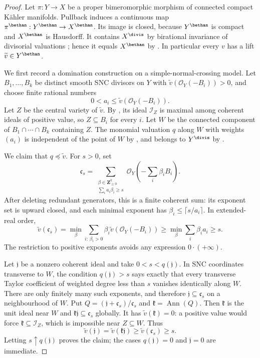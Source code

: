 \begin{proof}
Let \(\pi:Y\to X\) be a proper bimeromorphic morphism of connected
compact K\"ahler manifolds.  Pullback induces a continuous map
\(\pi^{\bethan}:Y^{\bethan}\to X^{\bethan}\).  Its image is closed,
because \(Y^{\bethan}\) is compact and \(X^{\bethan}\) is Hausdorff.  It
contains \(X^{\divis}\) by birational invariance of divisorial valuations
\cite[Remark~2.3.2]{MP24}; hence it equals \(X^{\bethan}\) by
.  In particular every \(v\) has a lift
\(\widetilde v\in Y^{\bethan}\).

We first record a domination construction on a simple-normal-crossing
model.  Let \(B_1,\ldots,B_k\) be distinct smooth SNC divisors on \(Y\)
with \(\widetilde v(\mathcal O_Y(-B_i))>0\), and choose finite rational
numbers
\[
 0<a_i\leq\widetilde v(\mathcal O_Y(-B_i)).
\tag{71.41c}\label{eq:p143-dominated-weights}
\]
Let \(Z\) be the central variety of \(\widetilde v\).  By
\cite[Lemma~2.1.1]{MP24}, its ideal \(\mathcal I_Z\) is maximal among
coherent ideals of positive value, so \(Z\subseteq B_i\) for every
\(i\).  Let \(W\) be the connected component of
\(B_1\cap\cdots\cap B_k\) containing \(Z\).  The monomial valuation
\(q\) along \(W\) with weights \((a_i)\) is independent of the point of
\(W\) by \cite[Proposition~2.3.4]{MP24}, and belongs to \(Y^{\divis}\)
by \cite[Remark~2.3.5]{MP24}.

We claim that \(q\preceq\widetilde v\).  For \(s>0\), set
\[
 \mathfrak c_s=
 \sum_{\substack{\beta\in\mathbf Z_{\geq0}^k\\
                   \sum_i a_i\beta_i\geq s}}
 \mathcal O_Y\left(-\sum_i\beta_iB_i\right).
\tag{71.41d}\label{eq:p143-monomial-ideal}
\]
After deleting redundant generators, this is a finite coherent sum: its
exponent set is upward closed, and each minimal exponent has
\(\beta_i\leq\lceil s/a_i\rceil\).  In extended-real order,
\[
 \widetilde v(\mathfrak c_s)
 =\min_{\beta}\sum_{i:\,\beta_i>0}
       \beta_i\widetilde v(\mathcal O_Y(-B_i))
 \geq\min_{\beta}\sum_i\beta_i a_i\geq s.
\tag{71.41e}\label{eq:p143-monomial-value-bound}
\]
The restriction to positive exponents avoids any expression
\(0\cdot(+\infty)\).

Let \(\mathfrak j\) be a nonzero coherent ideal and take
\(0<s<q(\mathfrak j)\).  In SNC coordinates transverse to \(W\), the
condition \(q(\mathfrak j)>s\) says exactly that every transverse Taylor
coefficient of weighted degree less than \(s\) vanishes identically along
\(W\).  There are only finitely many such exponents, and therefore
\(\mathfrak j\subseteq\mathfrak c_s\) on a neighbourhood of \(W\).
Put \(Q=(\mathfrak j+\mathfrak c_s)/\mathfrak c_s\) and
\(\mathfrak k=\operatorname{Ann}(Q)\).  Then \(\mathfrak k\) is the
unit ideal near \(W\) and \(\mathfrak k\mathfrak j\subseteq
\mathfrak c_s\) globally.  It has \(\widetilde v(\mathfrak k)=0\): a
positive value would force \(\mathfrak k\subseteq\mathcal I_Z\), which
is impossible near \(Z\subseteq W\).  Thus
\[
 \widetilde v(\mathfrak j)
 =\widetilde v(\mathfrak k\mathfrak j)
 \geq\widetilde v(\mathfrak c_s)\geq s.
\]
Letting \(s\uparrow q(\mathfrak j)\) proves the claim; the cases
\(q(\mathfrak j)=0\) and \(\mathfrak j=0\) are immediate.


\end{proof}
